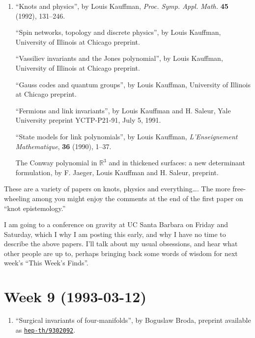\documentclass{article}
\def\tightlist{}
\begin{document}
\begin{enumerate}
\def\labelenumi{\arabic{enumi})}
\setcounter{enumi}{1}
\item
  ``Knots and physics'', by Louis Kauffman, \emph{Proc. Symp. Appl.
  Math.} \textbf{45} (1992), 131--246.

  ``Spin networks, topology and discrete physics'', by Louis Kauffman,
  University of Illinois at Chicago preprint.

  ``Vassiliev invariants and the Jones polynomial'', by Louis Kauffman,
  University of Illinois at Chicago preprint.

  ``Gauss codes and quantum groups'', by Louis Kauffman, University of
  Illinois at Chicago preprint.

  ``Fermions and link invariants'', by Louis Kauffman and H. Saleur,
  Yale University preprint YCTP-P21-91, July 5, 1991.

  ``State models for link polynomials'', by Louis Kauffman,
  \emph{L'Enseignement Mathematique}, \textbf{36} (1990), 1--37.

  The Conway polynomial in \(\mathbb{R}^3\) and in thickened surfaces: a
  new determinant formulation, by F. Jaeger, Louis Kauffman and H.
  Saleur, preprint.
\end{enumerate}

These are a variety of papers on knots, physics and everything\ldots.
The more free-wheeling among you might enjoy the comments at the end of
the first paper on ``knot epistemology.''

I am going to a conference on gravity at UC Santa Barbara on Friday and
Saturday, which I why I am posting this early, and why I have no time to
describe the above papers. I'll talk about my usual obsessions, and hear
what other people are up to, perhaps bringing back some words of wisdom
for next week's ``This Week's Finds''.
\hypertarget{week-9-1993-03-12}{%
\section{Week 9 (1993-03-12)}\label{week-9-1993-03-12}}

\begin{enumerate}
\def\labelenumi{\arabic{enumi}.}
\tightlist
\item
  ``Surgical invariants of four-manifolds'', by Boguslaw Broda, preprint
  available as
  \href{http://xxx.lanl.gov/abs/hep-th/9302092}{\texttt{hep-th/9302092}}.
\end{enumerate}
\end{document}
